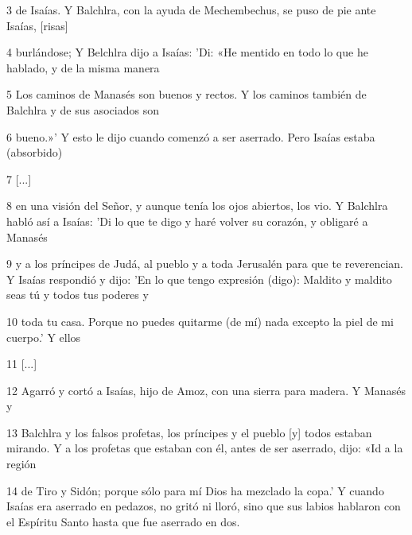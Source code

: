 \par 3 de Isaías. Y Balchlra, con la ayuda de Mechembechus, se puso de pie ante Isaías, [risas]

\par 4 burlándose; Y Belchlra dijo a Isaías: 'Di: «He mentido en todo lo que he hablado, y de la misma manera

\par 5 Los caminos de Manasés son buenos y rectos. Y los caminos también de Balchlra y de sus asociados son

\par 6 bueno.»' Y esto le dijo cuando comenzó a ser aserrado. Pero Isaías estaba (absorbido)

\par 7 [...]

\par 8 en una visión del Señor, y aunque tenía los ojos abiertos, los vio. Y Balchlra habló así a Isaías: 'Di lo que te digo y haré volver su corazón, y obligaré a Manasés

\par 9 y a los príncipes de Judá, al pueblo y a toda Jerusalén para que te reverencian. Y Isaías respondió y dijo: 'En lo que tengo expresión (digo): Maldito y maldito seas tú y todos tus poderes y

\par 10 toda tu casa. Porque no puedes quitarme (de mí) nada excepto la piel de mi cuerpo.' Y ellos

\par 11 [...]

\par 12 Agarró y cortó a Isaías, hijo de Amoz, con una sierra para madera. Y Manasés y

\par 13 Balchlra y los falsos profetas, los príncipes y el pueblo [y] todos estaban mirando. Y a los profetas que estaban con él, antes de ser aserrado, dijo: «Id a la región

\par 14 de Tiro y Sidón; porque sólo para mí Dios ha mezclado la copa.' Y cuando Isaías era aserrado en pedazos, no gritó ni lloró, sino que sus labios hablaron con el Espíritu Santo hasta que fue aserrado en dos.

